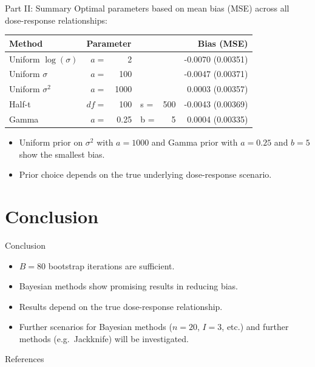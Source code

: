 \documentclass[
  ignorenonframetext,
  aspectratio=169]{beamer}
\newif\ifbibliography
\providecommand{\tightlist}{%
  \setlength{\itemsep}{0pt}\setlength{\parskip}{0pt}}
\begin{document}
\begin{frame}{Part II: Summary}
\protect{}\label{part-ii-summary}
Optimal parameters based on mean bias (MSE) across all dose-response
relationships:

\begin{tabular}{l r r l r r }
\textbf{Method} & \multicolumn{4}{l}{\textbf{Parameter}} & \textbf{Bias (MSE)} \\ \hline
Uniform $\log(\sigma)$ & $a = $ & 2& &  & -0.0070 (0.00351)  \\
Uniform $\sigma$ & $a = $ & 100 & &  & -0.0047 (0.00371)  \\
Uniform $\sigma^2$ & $a = $ & 1000 & &  & 0.0003 (0.00357)  \\
Half-t & $df = $ & 100& s = & 500 & -0.0043 (0.00369)  \\
Gamma & $a = $ & 0.25& b = & 5 & 0.0004 (0.00335)
\end{tabular}

\begin{itemize}
\tightlist
\item
  Uniform prior on \(\sigma^2\) with \(a = 1000\) and Gamma prior with
  \(a = 0.25\) and \(b = 5\) show the smallest bias.
\item
  Prior choice depends on the true underlying dose-response scenario.
\end{itemize}
\end{frame}

\section{Conclusion}\label{conclusion}

\begin{frame}{Conclusion}
\protect{}\label{conclusion-1}
\begin{itemize}
\tightlist
\item
  \(B = 80\) bootstrap iterations are sufficient.
\item
  Bayesian methods show promising results in reducing bias.
\item
  Results depend on the true dose-response relationship.
\item
  Further scenarios for Bayesian methods (\(n=20\), \(I=3\), etc.) and
  further methods (e.g.~Jackknife) will be investigated.
\end{itemize}
\end{frame}



\renewcommand\refname{References}
\begin{frame}[allowframebreaks]{References}
  \bibliographytrue
  
\end{frame}
\end{document}
